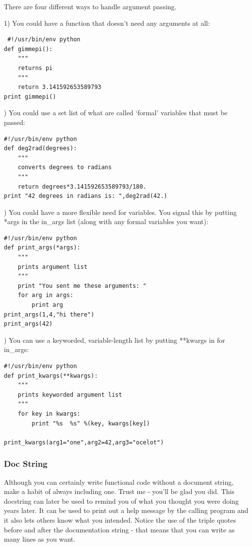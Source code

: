 \documentclass[11pt]{book}
\begin{document}
{{{{ There are four different ways to handle argument passing.

 1) You could have a function that doesn't  need any arguments at all:

 { \color{blue} \begin{verbatim}
 #!/usr/bin/env python
def gimmepi():
    """
    returns pi
    """
    return 3.141592653589793
print gimmepi()
\end{verbatim}}

)  You could use  a set list of what are called `formal' variables that must be passed:


{ \color{blue} \begin{verbatim}
#!/usr/bin/env python
def deg2rad(degrees):
    """
    converts degrees to radians
    """
    return degrees*3.141592653589793/180.
print "42 degrees in radians is: ",deg2rad(42.)
\end{verbatim}}

) You could have a more flexible need for variables.  You signal this by putting  *args in the in\_args list (along with any formal variables you want):

{ \color{blue} \begin{verbatim}
#!/usr/bin/env python
def print_args(*args):
    """
    prints argument list
    """
    print "You sent me these arguments: "
    for arg in args:
        print arg
print_args(1,4,"hi there")
print_args(42)
\end{verbatim}}

) You can use a keyworded, variable-length list by putting **kwargs in for in\_args:

{ \color{blue} \begin{verbatim}
#!/usr/bin/env python
def print_kwargs(**kwargs):
    """
    prints keyworded argument list
    """
    for key in kwargs:
        print "%s  %s" %(key, kwargs[key])

print_kwargs(arg1="one",arg2=42,arg3="ocelot")
\end{verbatim}}

 \subsubsection{Doc String}
 Although you can certainly write functional code without a document string, make a habit of always including one.  Trust me - you'll be glad you did.  This docstring can later be used to remind you of what you thought you were doing years later.  It can be used to print out a help message by the calling program and it also lets others know what you intended.   Notice the use of the triple quotes before and after the documentation string - that means that you can write as many lines as you want.

}}}}
\end{document}
